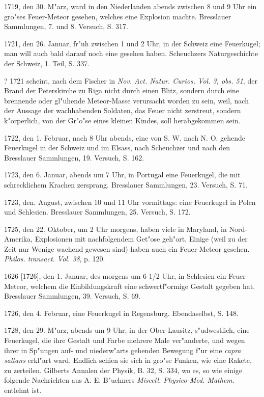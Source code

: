 \documentclass[a4paper, 11pt, oneside, polutonikogreek, german]{article}
\begin{document}
1719, den 30. M"arz, ward in den Niederlanden abends zwischen 8 und 9 Uhr ein gro"ses Feuer-Meteor gesehen, welches eine Explosion machte. Bresslauer Sammlungen, 7. und 8. Versuch, S. 317.

1721, den 26. Januar, fr"uh zwischen 1 und 2 Uhr, in der Schweiz eine Feuerkugel; man will auch bald darauf noch eine gesehen haben. Scheuchzers Naturgeschichte der Schweiz, 1. Teil, S. 337.

? 1721 scheint, nach dem Fischer in \emph{Nov. Act. Natur. Curios. Vol. 3, obs. 51}, der Brand der Peterskirche zu Riga nicht durch einen Blitz, sondern durch eine brennende oder gl"uhende Meteor-Masse verursacht worden zu sein, weil, nach der Aussage der wachhabenden Soldaten, das Feuer nicht zerstreut, sondern k"orperlich, von der Gr"o"se eines kleinen Kindes, soll herabgekommen sein.

1722, den 1. Februar, nach 8 Uhr abends, eine von S. W. nach N. O. gehende Feuerkugel in der Schweiz und im Elsass, nach Scheuchzer und nach den Bresslauer Sammlungen, 19. Versuch, S. 162.

1723, den 6. Januar, abends um 7 Uhr, in Portugal eine Feuerkugel, die mit schrecklichem Krachen zersprang. Bresslauer Sammlungen, 23. Versuch, S. 71.

1723, den. August, zwischen 10 und 11 Uhr vormittags: eine Feuerkugel in Polen und Schlesien. Bresslauer Sammlungen, 25. Versuch, S. 172.

1725, den 22. Oktober, um 2 Uhr morgens, haben viele in Maryland, in Nord-Amerika, Explosionen mit nachfolgendem Get"ose geh"ort, Einige (weil zu der Zeit nur Wenige wachend gewesen sind) haben auch ein Feuer-Meteor gesehen. \emph{Philos. transact. Vol. 38}, p. 120.

1626 [1726], den 1. Januar, des morgens um 6 1/2 Uhr, in Schlesien ein Feuer-Meteor, welchem die Einbildungskraft eine schwertf"ormige Gestalt gegeben hat. Bresslauer Sammlungen, 39. Versuch, S. 69.

1726, den 4. Februar, eine Feuerkugel in Regensburg. Ebendaselbst, S. 148.

1728, den 29. M"arz, abends um 9 Uhr, in der Ober-Lausitz, s"udwestlich, eine Feuerkugel, die ihre Gestalt und Farbe mehrere Male ver"anderte, und wegen ihrer in Sp"ungen auf- und niederw"arts gehenden Bewegung f"ur eine \emph{capra saltans} erkl"art ward. Endlich schien sie sich in gro"se Funken, wie eine Rakete, zu zerteilen. Gilberts Annalen der Physik, B. 32, S. 334, wo es, so wie einige folgende Nachrichten aus A. E. B"uchners \emph{Miscell. Physico-Med. Mathem.} entlehnt ist.
\end{document}
